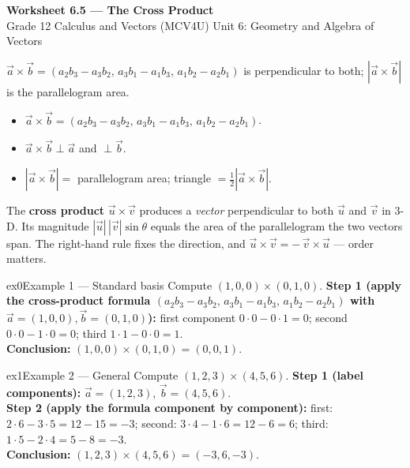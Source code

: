 \documentclass[11pt]{article}
\begin{document}
\begin{center}
{\LARGE\bfseries\color{titleblue}Worksheet 6.5 --- The Cross Product}\\[2pt]
{\small Grade 12 Calculus and Vectors (MCV4U) \textperiodcentered{} Unit 6: Geometry and Algebra of Vectors}
\end{center}

\begin{ideabox}
$\vec a\times\vec b=(a_2b_3-a_3b_2,\,a_3b_1-a_1b_3,\,a_1b_2-a_2b_1)$ is perpendicular to both; $|\vec a\times\vec b|$ is the parallelogram area.
\begin{itemize}[leftmargin=*,itemsep=2pt]
  \item $\vec a\times\vec b=(a_2b_3-a_3b_2,\,a_3b_1-a_1b_3,\,a_1b_2-a_2b_1)$.
  \item $\vec a\times\vec b\perp\vec a$ and $\perp\vec b$.
  \item $|\vec a\times\vec b|=$ parallelogram area; triangle $=\tfrac12|\vec a\times\vec b|$.
\end{itemize}
\end{ideabox}

\begin{learnbox}
The \textbf{cross product} $\vec u\times\vec v$ produces a \emph{vector} perpendicular to both $\vec u$ and $\vec v$ in 3-D.
Its magnitude $|\vec u|\,|\vec v|\sin\theta$ equals the area of the parallelogram the two vectors span.
The right-hand rule fixes the direction, and $\vec u\times\vec v=-\,\vec v\times\vec u$ — order matters.
\end{learnbox}


\begin{example}{ex0}{Example 1 --- Standard basis}
Compute $(1,0,0)\times(0,1,0)$.\soln
\textbf{Step 1 (apply the cross-product formula $(a_2b_3-a_3b_2,\,a_3b_1-a_1b_3,\,a_1b_2-a_2b_1)$ with $\vec a=(1,0,0),\vec b=(0,1,0)$):} first component $0\cdot0-0\cdot1=0$; second $0\cdot0-1\cdot0=0$; third $1\cdot1-0\cdot0=1$.\\[3pt]
\textbf{Conclusion:} $(1,0,0)\times(0,1,0)=(0,0,1)$.
\end{example}

\begin{example}{ex1}{Example 2 --- General}
Compute $(1,2,3)\times(4,5,6)$.\soln
\textbf{Step 1 (label components):} $\vec a=(1,2,3)$, $\vec b=(4,5,6)$.\\[3pt]
\textbf{Step 2 (apply the formula component by component):} first: $2\cdot6-3\cdot5=12-15=-3$; second: $3\cdot4-1\cdot6=12-6=6$; third: $1\cdot5-2\cdot4=5-8=-3$.\\[3pt]
\textbf{Conclusion:} $(1,2,3)\times(4,5,6)=(-3,6,-3)$.
\end{example}
\end{document}
